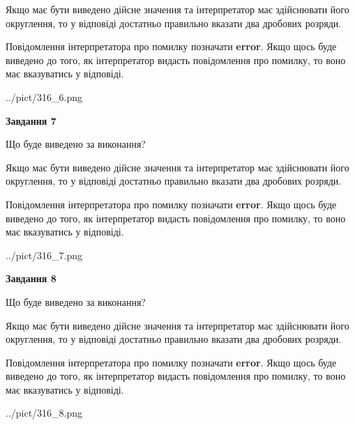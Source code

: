 \documentclass[12pt, ukrainian]{article}
\begin{document}
{\begin {Large}
Якщо має бути виведено дійсне значення та інтерпретатор має здійснювати його округлення, 
то у відповіді достатньо правильно вказати два дробових розряди.

Повідомлення інтерпретатора про помилку позначати \textbf{error}.
Якщо щось буде виведено до того, як інтерпретатор видасть повідомлення про помилку, 
то воно має вказуватись у відповіді. \par

\begin{center}
	{../pict/316_6.png}
\end{center}
\newpage

{\begin {center}\textbf{Завдання 7}\end {center}}\par
Що буде виведено за виконання? \par

Якщо має бути виведено дійсне значення та інтерпретатор має здійснювати його округлення, 
то у відповіді достатньо правильно вказати два дробових розряди.

Повідомлення інтерпретатора про помилку позначати \textbf{error}.
Якщо щось буде виведено до того, як інтерпретатор видасть повідомлення про помилку, 
то воно має вказуватись у відповіді. \par

\begin{center}
	{../pict/316_7.png}
\end{center}
\newpage

{\begin {center}\textbf{Завдання 8}\end {center}}\par
Що буде виведено за виконання? \par

Якщо має бути виведено дійсне значення та інтерпретатор має здійснювати його округлення, 
то у відповіді достатньо правильно вказати два дробових розряди.

Повідомлення інтерпретатора про помилку позначати \textbf{error}.
Якщо щось буде виведено до того, як інтерпретатор видасть повідомлення про помилку, 
то воно має вказуватись у відповіді. \par

\begin{center}
	{../pict/316_8.png}
\end{center}
\newpage


\end{Large}}
\end{document}
